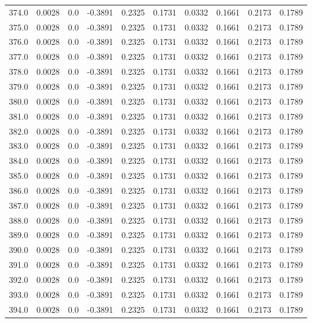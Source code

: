 \begin{longtable}{lrrrrrrrrr}
374.0 & 0.0028 & 0.0 & -0.3891 & 0.2325 & 0.1731 & 0.0332 & 0.1661 & 0.2173 & 0.1789 \\
375.0 & 0.0028 & 0.0 & -0.3891 & 0.2325 & 0.1731 & 0.0332 & 0.1661 & 0.2173 & 0.1789 \\
376.0 & 0.0028 & 0.0 & -0.3891 & 0.2325 & 0.1731 & 0.0332 & 0.1661 & 0.2173 & 0.1789 \\
377.0 & 0.0028 & 0.0 & -0.3891 & 0.2325 & 0.1731 & 0.0332 & 0.1661 & 0.2173 & 0.1789 \\
378.0 & 0.0028 & 0.0 & -0.3891 & 0.2325 & 0.1731 & 0.0332 & 0.1661 & 0.2173 & 0.1789 \\
379.0 & 0.0028 & 0.0 & -0.3891 & 0.2325 & 0.1731 & 0.0332 & 0.1661 & 0.2173 & 0.1789 \\
380.0 & 0.0028 & 0.0 & -0.3891 & 0.2325 & 0.1731 & 0.0332 & 0.1661 & 0.2173 & 0.1789 \\
381.0 & 0.0028 & 0.0 & -0.3891 & 0.2325 & 0.1731 & 0.0332 & 0.1661 & 0.2173 & 0.1789 \\
382.0 & 0.0028 & 0.0 & -0.3891 & 0.2325 & 0.1731 & 0.0332 & 0.1661 & 0.2173 & 0.1789 \\
383.0 & 0.0028 & 0.0 & -0.3891 & 0.2325 & 0.1731 & 0.0332 & 0.1661 & 0.2173 & 0.1789 \\
384.0 & 0.0028 & 0.0 & -0.3891 & 0.2325 & 0.1731 & 0.0332 & 0.1661 & 0.2173 & 0.1789 \\
385.0 & 0.0028 & 0.0 & -0.3891 & 0.2325 & 0.1731 & 0.0332 & 0.1661 & 0.2173 & 0.1789 \\
386.0 & 0.0028 & 0.0 & -0.3891 & 0.2325 & 0.1731 & 0.0332 & 0.1661 & 0.2173 & 0.1789 \\
387.0 & 0.0028 & 0.0 & -0.3891 & 0.2325 & 0.1731 & 0.0332 & 0.1661 & 0.2173 & 0.1789 \\
388.0 & 0.0028 & 0.0 & -0.3891 & 0.2325 & 0.1731 & 0.0332 & 0.1661 & 0.2173 & 0.1789 \\
389.0 & 0.0028 & 0.0 & -0.3891 & 0.2325 & 0.1731 & 0.0332 & 0.1661 & 0.2173 & 0.1789 \\
390.0 & 0.0028 & 0.0 & -0.3891 & 0.2325 & 0.1731 & 0.0332 & 0.1661 & 0.2173 & 0.1789 \\
391.0 & 0.0028 & 0.0 & -0.3891 & 0.2325 & 0.1731 & 0.0332 & 0.1661 & 0.2173 & 0.1789 \\
392.0 & 0.0028 & 0.0 & -0.3891 & 0.2325 & 0.1731 & 0.0332 & 0.1661 & 0.2173 & 0.1789 \\
393.0 & 0.0028 & 0.0 & -0.3891 & 0.2325 & 0.1731 & 0.0332 & 0.1661 & 0.2173 & 0.1789 \\
394.0 & 0.0028 & 0.0 & -0.3891 & 0.2325 & 0.1731 & 0.0332 & 0.1661 & 0.2173 & 0.1789 \\

\end{longtable}
